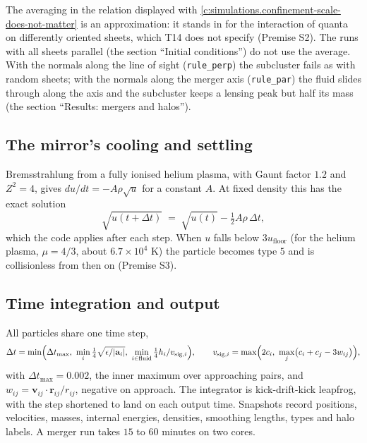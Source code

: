 \documentclass[11pt]{article}
\theoremstyle{definition}
\theoremstyle{plain}
\begin{document}
\label{c:note.simulations.setting-sheet-fluid-2}
The averaging in the relation displayed with \ref{c:simulations.confinement-scale-does-not-matter} is an approximation: it stands in for the interaction of quanta on differently oriented sheets, which T14 does not specify (Premise S2). The runs with all sheets parallel (the section ``Initial conditions'') do not use the average. With the normals along the line of sight (\texttt{rule\_perp}) the subcluster fails as with random sheets; with the normals along the merger axis (\texttt{rule\_par}) the fluid slides through along the axis and the subcluster keeps a lensing peak but half its mass (the section ``Results: mergers and halos'').

\subsection*{The mirror's cooling and settling}
\label{c:note.simulations.setting-mirrors-cooling-settling}
Bremsstrahlung from a fully ionised helium plasma, with Gaunt factor $1.2$ and $Z^{2} = 4$, gives $du/dt = -A\rho\sqrt{u}$ for a constant $A$. At fixed density this has the exact solution
\[
\sqrt{u(t + \Delta t)} \;=\; \sqrt{u(t)} - \tfrac{1}{2}A\rho\,\Delta t ,
\]
which the code applies after each step. When $u$ falls below $3u_{\mathrm{floor}}$ (for the helium plasma, $\mu = 4/3$, about $6.7 \times 10^{4}$ K) the particle becomes type $5$ and is collisionless from then on (Premise S3).

\subsection*{Time integration and output}
\label{c:note.simulations.setting-time-integration-output}
All particles share one time step,
\[
\Delta t = \min\Bigl(\Delta t_{\max},\ \min_{i}\tfrac{1}{4}\sqrt{\epsilon/|\mathbf{a}_{i}|},\ \min_{i\in\text{fluid}}\tfrac{1}{4}h_{i}/v_{\mathrm{sig},i}\Bigr),\qquad
v_{\mathrm{sig},i} = \max\Bigl(2c_{i},\ \max_{j}\bigl(c_{i} + c_{j} - 3w_{ij}\bigr)\Bigr),
\]
with $\Delta t_{\max} = 0.002$, the inner maximum over approaching pairs, and $w_{ij} = \mathbf{v}_{ij}\cdot\mathbf{r}_{ij}/r_{ij}$, negative on approach. The integrator is kick-drift-kick leapfrog, with the step shortened to land on each output time. Snapshots record positions, velocities, masses, internal energies, densities, smoothing lengths, types and halo labels. A merger run takes $15$ to $60$ minutes on two cores.
\end{document}
